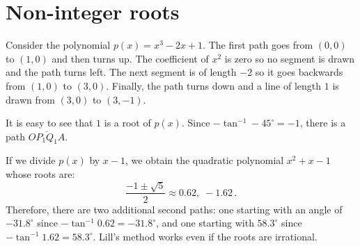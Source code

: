 \documentclass[11pt,a4paper]{article}
\newcommand*{\disfrac}[2]{\displaystyle\frac{#1}{#2}}
\begin{document}
\newpage

\section{Non-integer roots}\label{s.noninteger}

Consider the polynomial $p(x)=x^3-2x+1$. The first path goes from $(0,0)$ to $(1,0)$ and then turns up. The coefficient of $x^2$ is zero so no segment is drawn and the path turns left. The next segment is of length $-2$ so it goes backwards from $(1,0)$ to $(3,0)$. Finally, the path turns down and a line of length $1$ is drawn from $(3,0)$ to $(3,-1)$.


It is easy to see that $1$ is a root of $p(x)$. Since $-\tan^{-1} -45^\circ=-1$, there is a path $\overline{OP_1Q_1A}$.

 If we divide $p(x)$ by $x-1$, we obtain the quadratic polynomial $x^2+x-1$ whose roots are:
\[
\disfrac{-1\pm\sqrt{5}}{2} \approx 0.62,\; -1.62\,.
\]
Therefore, there are two additional second paths: one starting with an angle of $-31.8^\circ$ since $-\tan^{-1} 0.62=-31.8^\circ$, and one starting with $58.3^\circ$ since $-\tan^{-1}1.62=58.3^\circ$. Lill's method works even if the roots are irrational.
\end{document}
